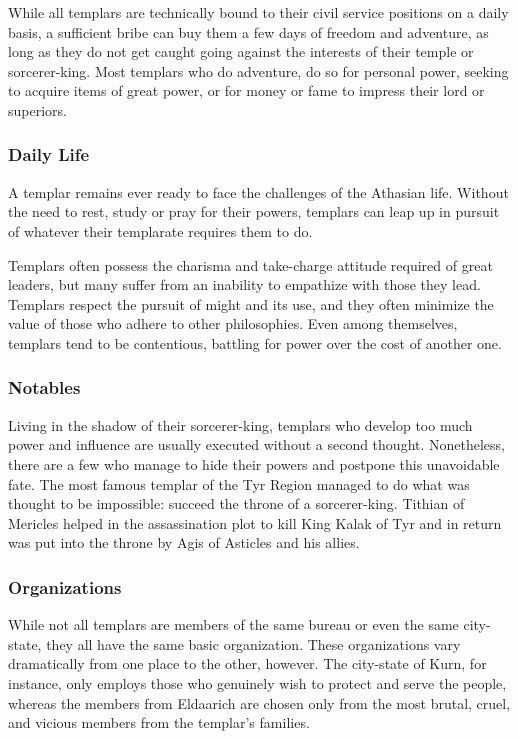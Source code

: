 While all templars are technically bound to their civil service positions on a daily basis, a sufficient bribe can buy them a few days of freedom and adventure, as long as they do not get caught going against the interests of their temple or sorcerer-king. Most templars who do adventure, do so for personal power, seeking to acquire items of great power, or for money or fame to impress their lord or superiors.

\subsubsection{Daily Life}
A templar remains ever ready to face the challenges of the Athasian life. Without the need to rest, study or pray for their powers, templars can leap up in pursuit of whatever their templarate requires them to do.

Templars often possess the charisma and take-charge attitude required of great leaders, but many suffer from an inability to empathize with those they lead. Templars respect the pursuit of might and its use, and they often minimize the value of those who adhere to other philosophies. Even among themselves, templars tend to be contentious, battling for power over the cost of another one.

\subsubsection{Notables}
Living in the shadow of their sorcerer-king, templars who develop too much power and influence are usually executed without a second thought. Nonetheless, there are a few who manage to hide their powers and postpone this unavoidable fate. The most famous templar of the Tyr Region managed to do what was thought to be impossible: succeed the throne of a sorcerer-king. Tithian of Mericles helped in the assassination plot to kill King Kalak of Tyr and in return was put into the throne by Agis of Asticles and his allies.

\subsubsection{Organizations}
While not all templars are members of the same bureau or even the same city-state, they all have the same basic organization. These organizations vary dramatically from one place to the other, however. The city-state of Kurn, for instance, only employs those who genuinely wish to protect and serve the people, whereas the members from Eldaarich are chosen only from the most brutal, cruel, and vicious members from the templar's families.

